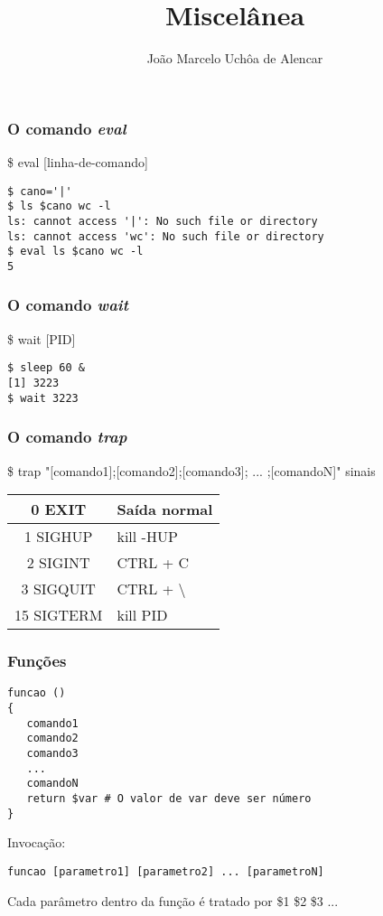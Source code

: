 \documentclass{beamer}
\title{Miscelânea}
\author[João Marcelo Uchôa de Alencar]{João Marcelo Uchôa de Alencar}
\institute{Universidade Federal do Ceará - Quixadá}
\begin{document}
   \begin{frame}
      \titlepage
   \end{frame}

   \begin{frame}[fragile]
      \frametitle{O comando \textit{eval}}
      \$ eval [linha-de-comando] \\
      \begin{verbatim}
$ cano='|'
$ ls $cano wc -l
ls: cannot access '|': No such file or directory
ls: cannot access 'wc': No such file or directory
$ eval ls $cano wc -l
5
      \end{verbatim}
\end{frame}

   \begin{frame}[fragile]
      \frametitle{O comando \textit{wait}}
      \$ wait [PID] \\
      \begin{verbatim}
$ sleep 60 &
[1] 3223
$ wait 3223
      \end{verbatim}
\end{frame}

   \begin{frame}
      \frametitle{O comando \textit{trap}}
      \begin{small}
 \$ trap "[comando1];[comando2];[comando3]; ... ;[comandoN]" sinais \\
      \end{small}   
      \begin{table}
         \begin{tabular}{c|l}
         0 EXIT     & Saída normal \\
         \hline 
         1 SIGHUP   & kill -HUP \\
         \hline 
         2 SIGINT   & CTRL + C \\
         \hline 
         3 SIGQUIT  & CTRL + \textbackslash \\
         \hline 
         15 SIGTERM & kill PID \\
         \hline 
         \end{tabular}
      \end{table}
   \end{frame}

   \begin{frame}[fragile]
      \frametitle{Funções}
      \begin{verbatim}
funcao ()
{
   comando1
   comando2
   comando3
   ...
   comandoN
   return $var # O valor de var deve ser número
}
   \end{verbatim}
      Invocação:
      \begin{verbatim}
funcao [parametro1] [parametro2] ... [parametroN] 
      \end{verbatim}
      Cada parâmetro dentro da função é tratado por \$1 \$2 \$3 ...
\end{frame}
\end{document}
